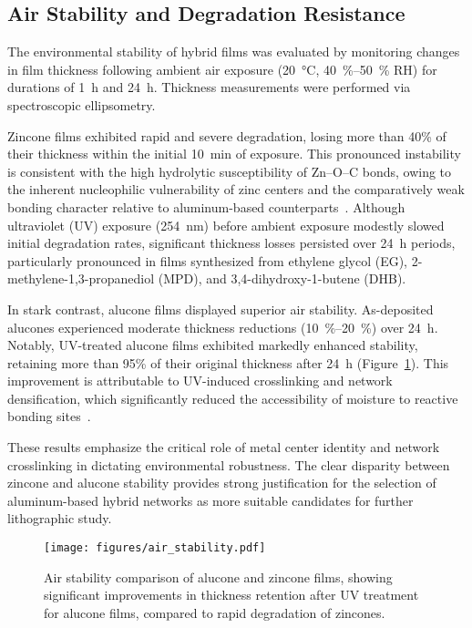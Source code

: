 \subsection{Air Stability and Degradation Resistance}

The environmental stability of hybrid films was evaluated by monitoring changes in film thickness following ambient air exposure (\SI{20}{\celsius}, \SIrange{40}{50}{\percent} RH) for durations of \SI{1}{\hour} and \SI{24}{\hour}. Thickness measurements were performed via spectroscopic ellipsometry.

Zincone films exhibited rapid and severe degradation, losing more than 40\% of their thickness within the initial \SI{10}{\minute} of exposure. This pronounced instability is consistent with the high hydrolytic susceptibility of Zn--O--C bonds, owing to the inherent nucleophilic vulnerability of zinc centers and the comparatively weak bonding character relative to aluminum-based counterparts~\cite{REF}. Although ultraviolet (UV) exposure (\SI{254}{\nano\meter}) before ambient exposure modestly slowed initial degradation rates, significant thickness losses persisted over \SI{24}{\hour} periods, particularly pronounced in films synthesized from ethylene glycol (EG), 2-methylene-1,3-propanediol (MPD), and 3,4-dihydroxy-1-butene (DHB).

In stark contrast, alucone films displayed superior air stability. As-deposited alucones experienced moderate thickness reductions (\SIrange{10}{20}{\percent}) over \SI{24}{\hour}. Notably, UV-treated alucone films exhibited markedly enhanced stability, retaining more than 95\% of their original thickness after \SI{24}{\hour} (Figure~\ref{fig:air_stability}). This improvement is attributable to UV-induced crosslinking and network densification, which significantly reduced the accessibility of moisture to reactive bonding sites~\cite{REF}.

These results emphasize the critical role of metal center identity and network crosslinking in dictating environmental robustness. The clear disparity between zincone and alucone stability provides strong justification for the selection of aluminum-based hybrid networks as more suitable candidates for further lithographic study.

\begin{figure}[ht]
  \centering
  \texttt{[image: figures/air\_stability.pdf]}
  \caption{Air stability comparison of alucone and zincone films, showing significant improvements in thickness retention after UV treatment for alucone films, compared to rapid degradation of zincones.}
  \label{fig:air_stability}
\end{figure}


